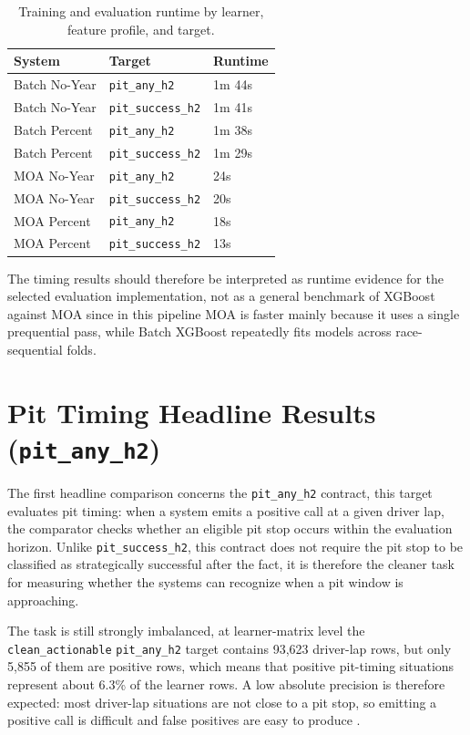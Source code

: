 \begin{table}[htbp]
    \centering
    \caption{Training and evaluation runtime by learner, feature profile, and target.}
    \label{tab:training_runtime_comparison}
    \begin{tabular}{lll}
        \toprule
        System        & Target                    & Runtime \\
        \midrule
        Batch No-Year & \texttt{pit\_any\_h2}     & 1m 44s  \\
        Batch No-Year & \texttt{pit\_success\_h2} & 1m 41s  \\
        Batch Percent & \texttt{pit\_any\_h2}     & 1m 38s  \\
        Batch Percent & \texttt{pit\_success\_h2} & 1m 29s  \\
        MOA No-Year   & \texttt{pit\_any\_h2}     & 24s     \\
        MOA No-Year   & \texttt{pit\_success\_h2} & 20s     \\
        MOA Percent   & \texttt{pit\_any\_h2}     & 18s     \\
        MOA Percent   & \texttt{pit\_success\_h2} & 13s     \\
        \bottomrule
    \end{tabular}
\end{table}
\FloatBarrier

The timing results should therefore be interpreted as runtime evidence for the selected evaluation implementation, not as a general benchmark of
XGBoost against MOA since in this pipeline MOA is faster mainly because it uses a single prequential pass, while Batch XGBoost repeatedly fits models across
race-sequential folds.


\section{Pit Timing Headline Results (\texttt{pit\_any\_h2})}

The first headline comparison concerns the \texttt{pit\_any\_h2} contract, this target evaluates pit timing: when a system emits a positive call at a
given driver lap, the comparator checks whether an eligible pit stop occurs within the evaluation horizon. Unlike \texttt{pit\_success\_h2}, this contract does
not require the pit stop to be classified as strategically successful after the fact, it is therefore the cleaner task for measuring whether the systems can
recognize when a pit window is approaching.

The task is still strongly imbalanced, at learner-matrix level the \texttt{clean\_actionable} \texttt{pit\_any\_h2} target contains 93,623 driver-lap rows,
but only 5,855 of them are positive rows, which means that positive pit-timing situations represent about 6.3\% of the learner rows. A low absolute precision is
therefore expected: most driver-lap situations are not close to a pit stop, so emitting a positive call is difficult and false positives are easy to produce \cite{he2009imbalanced}.

